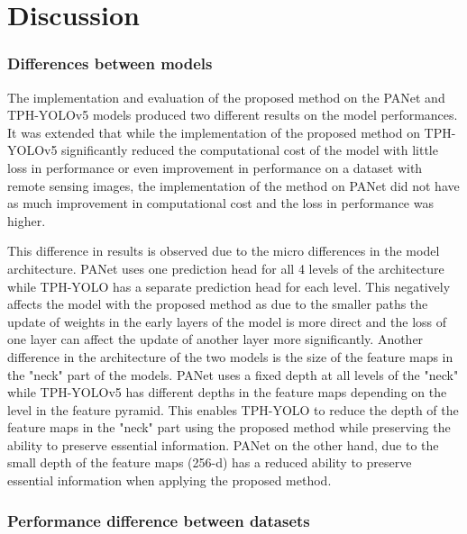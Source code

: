 \chapter{Discussion}


\subsection{Differences between models}

The implementation and evaluation of the proposed method on the PANet and
TPH-YOLOv5 models produced two different results on the model performances.
It was extended that while the implementation of the proposed method on TPH-
YOLOv5 significantly reduced the computational cost of the model with little loss
in performance or even improvement in performance on a dataset with remote
sensing images, the implementation of the method on PANet did not have as
much improvement in computational cost and the loss in performance was
higher.

This difference in results is observed due to the micro differences in the model
architecture. PANet uses one prediction head for all 4 levels of the architecture
while TPH-YOLO has a separate prediction head for each level. This negatively
affects the model with the proposed method as due to the smaller paths the
update of weights in the early layers of the model is more direct and the loss of
one layer can affect the update of another layer more significantly. Another
difference in the architecture of the two models is the size of the feature maps in
the "neck" part of the models. PANet uses a fixed depth at all levels of the "neck"
while TPH-YOLOv5 has different depths in the feature maps depending on the
level in the feature pyramid. This enables TPH-YOLO to reduce the depth of the
feature maps in the "neck" part using the proposed method while preserving the
ability to preserve essential information. PANet on the other hand, due to the
small depth of the feature maps (256-d) has a reduced ability to preserve essential
information when applying the proposed method.


\subsection{Performance difference between datasets}



